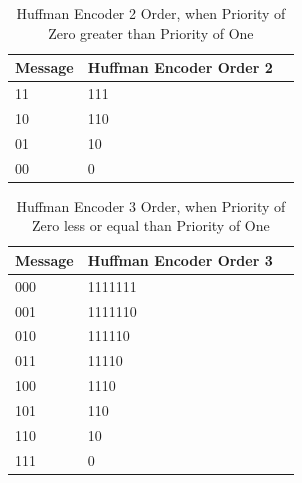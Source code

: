 \begin{refsection}
\begin{table}[H]
\begin{tabular}{|l|l|l|}
\end{tabular}
\end{table}

\begin{table}[H]
\centering
\caption{Huffman Encoder 2 Order, when Priority of Zero greater than Priority of One}
\label{tb:hufmmanencoder3}
\begin{tabular}{|l|l|l|}
\hline
\textbf{Message}                      & \textbf{Huffman Encoder Order 2}                                       \\ \hline
11                 & 111                                                          \\ \hline
10                 & 110                                                          \\ \hline
01                 & 10                                                         \\ \hline
00                 & 0                                                         \\ \hline

\end{tabular}
\end{table}


\begin{table}[H]
\centering
\caption{Huffman Encoder 3 Order, when Priority of Zero less or equal than Priority of One}
\label{tb:hufmmanencoder4}
\begin{tabular}{|l|l|l|}
\hline
\textbf{Message}                      & \textbf{Huffman Encoder Order 3}                                       \\ \hline
000                 & 1111111                                                          \\ \hline
001                 & 1111110                                                          \\ \hline
010                 & 111110                                                         \\ \hline
011                 & 11110                                                   \\ \hline
100                 & 1110                                                          \\ \hline
101                 & 110                                                          \\ \hline
110                 & 10                                                         \\ \hline
111                 & 0                                                         \\ \hline
\end{tabular}
\end{table}


\end{refsection}
